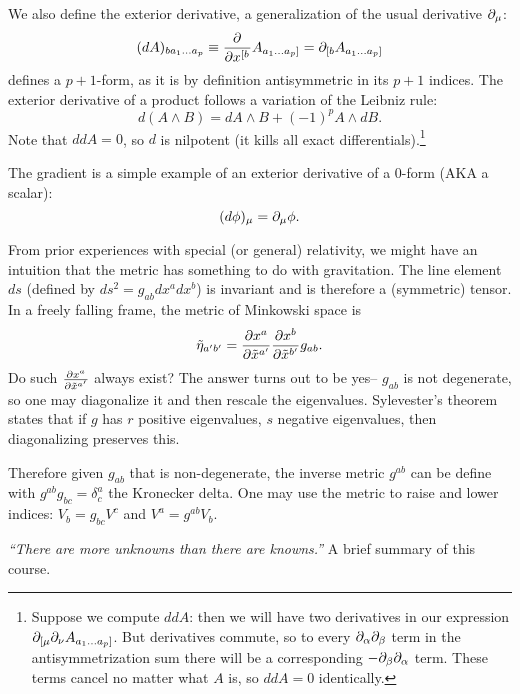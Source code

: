 \begin{defn}
We also define the exterior derivative, a generalization of the usual derivative $\partial_\mu$:
$$(dA)_{ba_1 \ldots a_p} \equiv \frac{\partial^{} {}}{\partial {{x^{[b}}} ^{}} A_{a_1 \ldots a_p]}=\partial_{[b}A_{a_1 \ldots a_p]}$$
defines a $p+1$-form, as it is by definition antisymmetric in its $p+1$ indices.
The exterior derivative of a product follows a variation of the Leibniz rule:
$$d(A\wedge B)=dA\wedge B +(-1)^p A\wedge dB.$$
Note that $ddA=0$, so $d$ is nilpotent (it kills all exact differentials).\footnote{Suppose we compute $ddA$: then we will have two derivatives in our expression $\partial_{[\mu} \partial_\nu A_{a_1\ldots a_p]}$. But derivatives commute, so to every $\partial_\alpha \partial_\beta$ term in the antisymmetrization sum there will be a corresponding $-\partial_\beta \partial_\alpha$ term. These terms cancel no matter what $A$ is, so $ddA=0$ identically.}
\end{defn}

The gradient is a simple example of an exterior derivative of a 0-form (AKA a scalar):
$$(d\phi)_\mu=\partial_\mu \phi.$$

From prior experiences with special (or general) relativity, we might have an intuition that the metric has something to do with gravitation. The line element $ds$ (defined by $ds^2 = g_{ab}dx^a dx^b$) is invariant and is therefore a (symmetric) tensor. In a freely falling frame, the metric of Minkowski space is $$\tilde \eta_{a'b'} = \frac{\partial x^a}{\partial\tilde x^{a'}}\frac{\partial x^b}{\partial \tilde x^{b'} }g_{ab}.$$ Do such $\frac{\partial x^a}{\partial\tilde x^{a'}}$ always exist? The answer turns out to be yes-- $g_{ab}$ is not degenerate, so one may diagonalize it and then rescale the eigenvalues. Sylevester's theorem states that if $g$ has $r$ positive eigenvalues, $s$ negative eigenvalues, then diagonalizing preserves this.%

Therefore given $g_{ab}$ that is non-degenerate, the inverse metric $g^{ab}$ can be define with $g^{ab}g_{bc}=\delta^a_c$ the Kronecker delta. One may use the metric to raise and lower indices:
$V_b=g_{bc}V^c$ and $V^a = g^{ab}V_b$.

\textit{``There are more unknowns than there are knowns.''} A brief summary of this course.
